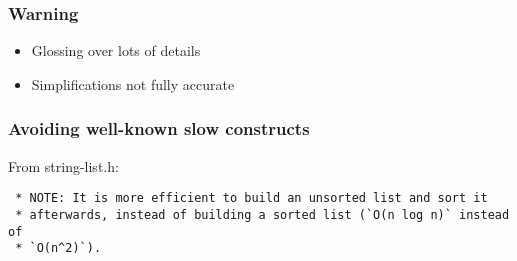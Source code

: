 \documentclass[compress,t]{beamer}
\begin{document}

\begin{frame}
  \frametitle{Warning}

  \vfill
  \begin{center}
    \begin{minipage}{0.55\textwidth}
    \begin{itemize}
      \item Glossing over lots of details
      \item Simplifications not fully accurate
    \end{itemize}
    \end{minipage}
  \end{center}
\end{frame}


\begin{frame}[fragile]
  \frametitle{Avoiding well-known slow constructs}

  From string-list.h:
  {\scriptsize
  \vspace*{-0.5\baselineskip}
  \begin{verbatim}
 * NOTE: It is more efficient to build an unsorted list and sort it
 * afterwards, instead of building a sorted list (`O(n log n)` instead of
 * `O(n^2)`).
  \end{verbatim}
  \vspace*{-\baselineskip}
  }

\end{frame}

\end{document}
